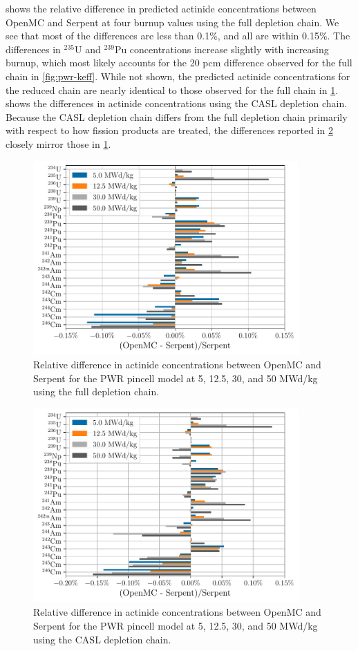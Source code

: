 \documentclass[3p,authoryear]{elsarticle}
\begin{document}
 shows the relative difference in predicted
actinide concentrations between OpenMC and Serpent at four burnup values using
the full depletion chain. We see that most of the differences are less than
0.1\%, and all are within 0.15\%. The differences in $^{235}$U and $^{239}$Pu
concentrations increase slightly with increasing burnup, which most likely
accounts for the 20 pcm difference observed for the full chain in
\cref{fig:pwr-keff}. While not shown, the predicted actinide concentrations for
the reduced chain are nearly identical to those observed for the full chain in
\cref{fig:pwr-actinides-full}.  shows the
differences in actinide concentrations using the CASL depletion chain. Because
the CASL depletion chain differs from the full depletion chain primarily with
respect to how fission products are treated, the differences reported in
\cref{fig:pwr-actinides-casl} closely mirror those in
\cref{fig:pwr-actinides-full}.
\begin{figure}[H]
  \centering
  \includegraphics[width=4in]{figures/pwr_actinides_full.pdf}
  \caption{Relative difference in actinide concentrations between OpenMC and
  Serpent for the PWR pincell model at 5, 12.5, 30, and 50 MWd/kg using the full
  depletion chain.}
  \label{fig:pwr-actinides-full}
\end{figure}
\begin{figure}[H]
  \centering
  \includegraphics[width=4in]{figures/pwr_actinides_casl.pdf}
  \caption{Relative difference in actinide concentrations between OpenMC and
  Serpent for the PWR pincell model at 5, 12.5, 30, and 50 MWd/kg using the CASL
  depletion chain.}
  \label{fig:pwr-actinides-casl}
\end{figure}
\end{document}

